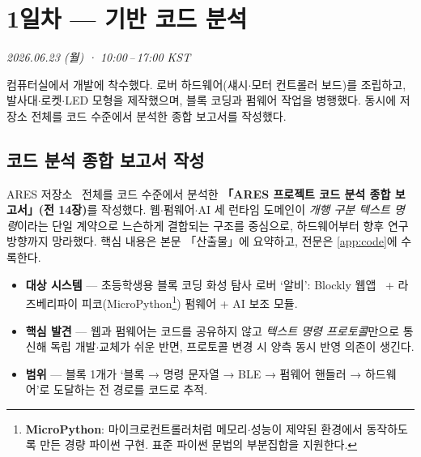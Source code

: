 


\chapter{1일차 — 기반 코드 분석}
\textit{2026.06.23 (월) · 10:00\,--\,17:00 KST}

\begin{summarybox}
컴퓨터실에서 개발에 착수했다. 로버 하드웨어(섀시$\cdot$모터 컨트롤러 보드)를
조립하고, 발사대$\cdot$로켓$\cdot$LED 모형을 제작했으며, 블록 코딩과 펌웨어 작업을
병행했다. 동시에 저장소 전체를 코드 수준에서 분석한 종합 보고서를 작성했다.
\end{summarybox}

\section{코드 분석 종합 보고서 작성}
ARES 저장소~\cite{ares-repo} 전체를 코드 수준에서 분석한 \textbf{「ARES 프로젝트
코드 분석 종합 보고서」(전 14장)}를 작성했다. 웹$\cdot$펌웨어$\cdot$AI 세 런타임
도메인이 \emph{개행 구분 텍스트 명령}이라는 단일 계약으로 느슨하게 결합되는
구조를 중심으로, 하드웨어부터 향후 연구 방향까지 망라했다. 핵심 내용은 본문
「산출물」에 요약하고, 전문은 \ref{app:code}에 수록한다.

\smallskip
{}

\begin{itemize}
  \item \textbf{대상 시스템} — 초등학생용 블록 코딩 화성 탐사 로버 ‘알비’:
  Blockly 웹앱~\cite{blockly} + 라즈베리파이 피코(MicroPython\footnote{\textbf{MicroPython}:
  마이크로컨트롤러처럼 메모리$\cdot$성능이 제약된 환경에서 동작하도록 만든 경량 파이썬 구현.
  표준 파이썬 문법의 부분집합을 지원한다.}) 펌웨어 + AI 보조 모듈.
  \item \textbf{핵심 발견} — 웹과 펌웨어는 코드를 공유하지 않고 \emph{텍스트 명령
  프로토콜}만으로 통신해 독립 개발$\cdot$교체가 쉬운 반면, 프로토콜 변경 시 양측
  동시 반영 의존이 생긴다.
  \item \textbf{범위} — 블록 1개가 ‘블록 → 명령 문자열 → BLE → 펌웨어 핸들러 →
  하드웨어’로 도달하는 전 경로를 코드로 추적.
\end{itemize}

